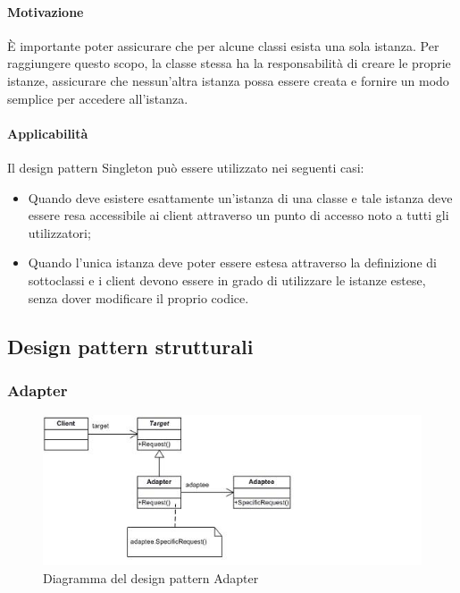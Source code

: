 \paragraph{Motivazione\\}
È importante poter assicurare che per alcune classi esista una sola istanza. Per raggiungere questo scopo, la classe stessa ha la responsabilità di creare le proprie istanze, assicurare che nessun'altra istanza possa essere creata e fornire un modo semplice per accedere all'istanza.

\paragraph{Applicabilità\\} 
Il design pattern\glossario{} Singleton può essere utilizzato nei seguenti casi:
\begin{itemize}
\item Quando deve esistere esattamente un'istanza di una classe e tale istanza deve essere resa accessibile ai client attraverso un punto di accesso noto a tutti gli utilizzatori;
\item Quando l'unica istanza deve poter essere estesa attraverso la definizione di sottoclassi e i client devono essere in grado di utilizzare le istanze estese, senza dover modificare il proprio codice.
\end{itemize}
\pagebreak

\subsection{Design pattern strutturali}
\subsubsection{Adapter}
\label{DPAda}
\begin{figure} [!h]
	\centering
	\includegraphics[width=\linewidth]{./Content/Immagini/adapter.jpg}
	\caption{Diagramma del design pattern Adapter}
	\label{figAda}
\end{figure}
